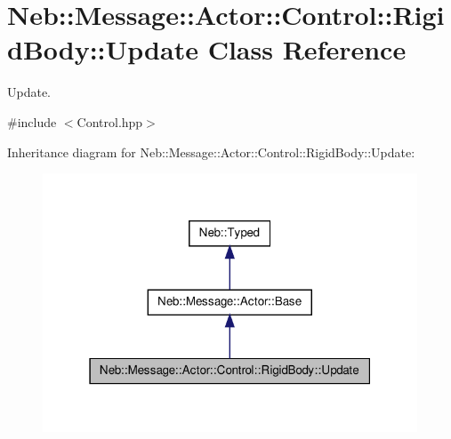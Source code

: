 \hypertarget{classNeb_1_1Message_1_1Actor_1_1Control_1_1RigidBody_1_1Update}{\section{\-Neb\-:\-:\-Message\-:\-:\-Actor\-:\-:\-Control\-:\-:\-Rigid\-Body\-:\-:\-Update \-Class \-Reference}
\label{classNeb_1_1Message_1_1Actor_1_1Control_1_1RigidBody_1_1Update}
}


\-Update.  




{\ttfamily \#include $<$\-Control.\-hpp$>$}



\-Inheritance diagram for \-Neb\-:\-:\-Message\-:\-:\-Actor\-:\-:\-Control\-:\-:\-Rigid\-Body\-:\-:\-Update\-:
\nopagebreak
\begin{figure}[H]
\begin{center}
\leavevmode
\includegraphics[width=316pt]{classNeb_1_1Message_1_1Actor_1_1Control_1_1RigidBody_1_1Update__inherit__graph}
\end{center}
\end{figure}


